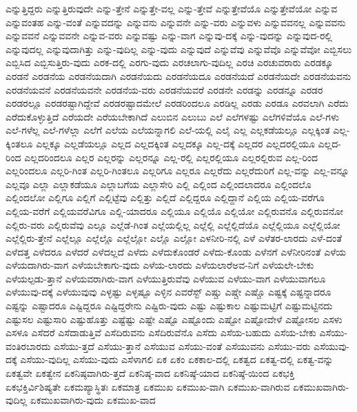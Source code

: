 {ಎನ್ನುತ್ತಿದ್ದರು
ಎನ್ನುತ್ತಿರುವುದೇ
ಎನ್ನು-ತ್ತೇನೆ
ಎನ್ನುತ್ತೇ-ವಲ್ಲ
ಎನ್ನು-ತ್ತೇವೆ
ಎನ್ನುತ್ತೇವೆಯೊ
ಎನ್ನುತ್ತೇವೆಯೋ
ಎನ್ನುವ
ಎನ್ನುವಂತಹ
ಎನ್ನು-ವಂತೆ
ಎನ್ನುವದನ್ನು
ಎನ್ನುವನು
ಎನ್ನುವನೇ
ಎನ್ನು-ವರು
ಎನ್ನುವಳು
ಎನ್ನುವವನಲ್ಲ
ಎನ್ನುವವನು
ಎನ್ನುವವನೆ
ಎನ್ನುವವನೇ
ಎನ್ನುವ-ವರು
ಎನ್ನುವಷ್ಟು
ಎನ್ನು-ವಾಗ
ಎನ್ನುವು-ದಕ್ಕೆ
ಎನ್ನು-ವುದನ್ನು
ಎನ್ನುವುದ-ರಲ್ಲಿ
ಎನ್ನುವುದಲ್ಲ
ಎನ್ನುವುದಾಗಿತ್ತು
ಎನ್ನು-ವುದಿಲ್ಲ
ಎನ್ನು-ವುದು
ಎನ್ನುವುದೆ
ಎನ್ನುವೆವು
ಎನ್ನುವೆವೊ
ಎನ್ನುವೆವೋ
ಎಬ್ಬಿಸಲು
ಎಬ್ಬಿಸಿದ
ಎಬ್ಬಿಸುತ್ತಿರು-ವುದು
ಎರಕ-ದಲ್ಲಿ
ಎರಗು-ವುದು
ಎರಚಲಾಗು-ವುದಿಲ್ಲ
ಎರಚಿ
ಎರಚುವರಾರು
ಎರಡಕ್ಕೂ
ಎರಡನೆ
ಎರಡನೆಯ
ಎರಡನೆಯದಾಗಿ
ಎರಡನೆಯದು
ಎರಡನೆಯದೂ
ಎರಡನೆಯದೆ
ಎರಡನೆಯದೇ
ಎರಡನೆಯವನು
ಎರಡನೆಯವನೆ
ಎರಡನೆಯವನೇ
ಎರಡನೆಯ-ವರು
ಎರಡನೆಯವರೆ
ಎರಡನೇ
ಎರಡನ್ನು
ಎರಡನ್ನೂ
ಎರಡರ
ಎರಡರಲ್ಲೂ
ಎರಡರಷ್ಟಾಗಿದ್ದೇವೆ
ಎರಡರಷ್ಟಾದಮೇಲೆ
ಎರಡರಿಂದಲೂ
ಎರಡಿಲ್ಲ
ಎರಡು
ಎರಡೂ
ಎರವಲಾಗಿ
ಎರೆದು
ಎರೆದುಕೊಳ್ಳುತ್ತಿದೆ
ಎರೆಯದೇ
ಎರೆಯಬೇಕಾಗಿದೆ
ಎಲುಬಿನ
ಎಲುಬು
ಎಲೆ
ಎಲೆಗಳಷ್ಟು
ಎಲೆಗಳಿವೆಯೊ
ಎಲೆ-ಗಳು
ಎಲೆ-ಗಳೆಲ್ಲ
ಎಲೆ-ಗಳೆಲ್ಲಾ
ಎಲೆಗೆ
ಎಲೆಯ
ಎಲೆಯನ್ನಾಗಲಿ
ಎಲೆ-ಯಲ್ಲಿ
ಎಲೈ
ಎಲ್ಲ
ಎಲ್ಲಕಡೆಯಲ್ಲೂ
ಎಲ್ಲಕ್ಕಿಂತ
ಎಲ್ಲ-ಕ್ಕಿಂತಲೂ
ಎಲ್ಲಕ್ಕೂ
ಎಲ್ಲಡೆಯಲ್ಲೂ
ಎಲ್ಲದ
ಎಲ್ಲದಕ್ಕಿಂತ
ಎಲ್ಲದಕ್ಕೂ
ಎಲ್ಲ-ದಕ್ಕೆ
ಎಲ್ಲದರ
ಎಲ್ಲದರಲ್ಲಿಯೂ
ಎಲ್ಲದ-ರಿಂದ
ಎಲ್ಲದರಿಂದಲೂ
ಎಲ್ಲರ
ಎಲ್ಲರನ್ನು
ಎಲ್ಲರನ್ನೂ
ಎಲ್ಲ-ರಲ್ಲಿ
ಎಲ್ಲರಲ್ಲಿಯೂ
ಎಲ್ಲರಲ್ಲಿರುವ
ಎಲ್ಲ-ರಿಂದ
ಎಲ್ಲರಿಂದಲೂ
ಎಲ್ಲರಿ-ಗಿಂತ
ಎಲ್ಲರಿ-ಗಿಂತಲೂ
ಎಲ್ಲರಿಗೂ
ಎಲ್ಲರೂ
ಎಲ್ಲರೆದು
ಎಲ್ಲರೆದುರಿಗೆ
ಎಲ್ಲ-ವನ್ನು
ಎಲ್ಲ-ವನ್ನೂ
ಎಲ್ಲವೂ
ಎಲ್ಲಾ
ಎಲ್ಲಾಕಡೆಯೂ
ಎಲ್ಲಾಬಗೆಯ
ಎಲ್ಲಾಸೇರಿ
ಎಲ್ಲಿ
ಎಲ್ಲಿಂದ
ಎಲ್ಲಿಂದಲಾದರೂ
ಎಲ್ಲಿಂದಲೊ
ಎಲ್ಲಿಂದಲೋ
ಎಲ್ಲಿಗೂ
ಎಲ್ಲಿಗೆ
ಎಲ್ಲಿಟ್ಟೆವು
ಎಲ್ಲಿತ್ತು
ಎಲ್ಲಿದೆ
ಎಲ್ಲಿದ್ದರೂ
ಎಲ್ಲಿದ್ದಾನೆ
ಎಲ್ಲಿಯ
ಎಲ್ಲಿಯ-ವರೆಗೂ
ಎಲ್ಲಿಯ-ವರೆಗೆ
ಎಲ್ಲಿಯವರೆವಿಗೂ
ಎಲ್ಲಿ-ಯಾದರೂ
ಎಲ್ಲಿಯೂ
ಎಲ್ಲಿಯೊ
ಎಲ್ಲಿಯೋ
ಎಲ್ಲಿರುವನೊ
ಎಲ್ಲಿರುವನೋ
ಎಲ್ಲಿರು-ವರು
ಎಲ್ಲಿರುವೆವು
ಎಲ್ಲೂ
ಎಲ್ಲೆಡೆ-ಗಿಂತ
ಎಲ್ಲೆಯಲ್ಲಿಲ್ಲ
ಎಲ್ಲೆಲ್ಲಿ
ಎಲ್ಲೆಲ್ಲಿದೆಯೊ
ಎಲ್ಲೆಲ್ಲಿಯೂ
ಎಲ್ಲೆಲ್ಲಿಯೋ
ಎಲ್ಲೆಲ್ಲಿರು-ತ್ತೇನೆ
ಎಲ್ಲೆಲ್ಲೂ
ಎಲ್ಲೆಲ್ಲೊ
ಎಲ್ಲೆಲ್ಲೋ
ಎಲ್ಲೊ
ಎಲ್ಲೋ
ಎಳನೀರಿ-ನಲ್ಲಿ
ಎಳೆ
ಎಳೆತರ-ಲಾರದು
ಎಳೆ-ದಂತೆ
ಎಳೆದತ್ತ
ಎಳೆದರೂ
ಎಳೆದರೆ
ಎಳೆದಲ್ಲದೆ
ಎಳೆದು
ಎಳೆದುಕೊಂಡರೆ
ಎಳೆದು-ಕೊಂಡು
ಎಳೆನಗೆ
ಎಳೆನೀರಿನಂತೆ
ಎಳೆಯ
ಎಳೆಯದಾಗಿರು-ವಾಗ
ಎಳೆಯಬೇಕಾಗು-ವುದು
ಎಳೆಯ-ಲಾರದು
ಎಳೆಯಲಾರೆಅವ-ನಿಗೆ
ಎಳೆಯಲೇ-ಬೇಕು
ಎಳೆಯಲ್ಪಡು-ತ್ತಾನೆ
ಎಳೆಯವರಾಗಿರು-ವಾಗ
ಎಳೆಯುತ್ತಿರುವೆವು
ಎಳೆಯುವ
ಎಳೆಯು-ವಾಗ
ಎಳೆಯುವಾಗಲೂ
ಎಳೆಯುವು-ದಕ್ಕೆ
ಎಳೆಯುವುವು
ಎಳ್ಳಷ್ಟು
ಎಳ್ಳಷ್ಟೂ
ಎಳ್ಳಿನ
ಎವರೆಸ್ಟ್
ಎಷ್ಚು
ಎಷ್ಚೇ
ಎಷ್ಚೊ
ಎಷ್ಟಕ್ಕೆ
ಎಷ್ಟನ್ನಾದರೂ
ಎಷ್ಟನ್ನು
ಎಷ್ಟಾದರೂ
ಎಷ್ಟಿದ್ದರೂ
ಎಷ್ಟಿದ್ದರೇನು
ಎಷ್ಟಿರು-ವುದು
ಎಷ್ಟು
ಎಷ್ಟುಕಾಲ
ಎಷ್ಟುಮಟ್ಟಿಗೆ
ಎಷ್ಟುಮಟ್ಟಿನದು
ಎಷ್ಟುಸಲ
ಎಷ್ಟುಸಾರಿ
ಎಷ್ಟುಹೊತ್ತು
ಎಷ್ಟೆಷ್ಟು
ಎಷ್ಟೇ
ಎಷ್ಟೊ
ಎಷ್ಟೊಂದು
ಎಷ್ಟೋ
ಎಷ್ಟೋವೇಳೆ
ಎಷ್ಟೋಸಲ
ಎಸಳು
ಎಸಳೂ
ಎಸೆದರೆ
ಎಸೆದಾಡುತ್ತಿವೆ
ಎಸೆದಿರುವನು
ಎಸೆದಿರುವೆನೊ
ಎಸೆದು
ಎಸೆಯ-ಬಹುದು
ಎಸೆಯ-ಬೇಕು
ಎಸೆಯು-ವಂತಿರಬಾರದು
ಎಸೆಯು-ತ್ತದೆ
ಎಸೆಯು-ತ್ತಾನೆ
ಎಸೆಯುವ
ಎಸೆಯು-ವಂತೆ
ಎಸೆಯುವನು
ಎಸೆಯು-ವರು
ಎಸೆಯುವು-ದಕ್ಕೆ
ಎಸೆಯು-ವುದಿಲ್ಲ
ಎಸೆಯು-ವುದು
ಎಸೆಳಾಗಲಿ
ಏಕ
ಏಕಂ
ಏಕಕಾಲ-ದಲ್ಲಿ
ಏಕತ್ವದ
ಏಕತ್ವ-ದಲ್ಲಿ
ಏಕತ್ವ-ವನ್ನು
ಏಕತ್ವವೇ
ಏಕತ್ವೇನ
ಏಕನಿಷ್ಠವಾಗಿರು-ತ್ತದೆ
ಏಕನಿಷ್ಠ-ವಾದ
ಏಕನಿಷ್ಠೆ-ಯಾದ
ಏಕನಿಷ್ಠೆ-ಯಿಂದ
ಏಕಭಕ್ತಿ
ಏಕಭಕ್ತಿರ್ವಿಶಿಷ್ಯತೇ
ಏಕಮಪ್ಯಾಸ್ಥಿತಃ
ಏಕಮಾತ್ರ
ಏಕಮುಖ
ಏಕಮುಖ-ವಾಗಿ
ಏಕಮುಖ-ವಾಗಿರುವ
ಏಕಮುಖವಾಗಿರು-ವುದಿಲ್ಲ
ಏಕಮುಖವಾಗಿರು-ವುದು
ಏಕಮುಖ-ವಾದ
}
